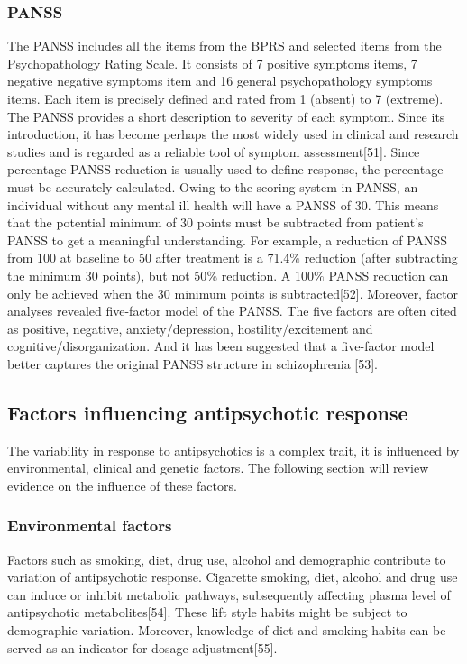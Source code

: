 \documentclass[12pt]{report}
\begin{document}
			\subsubsection{PANSS}
				The PANSS includes all the items from the BPRS and selected items from the Psychopathology Rating Scale. 
				It consists of 7 positive symptoms items, 7 negative negative symptoms item and 16 general psychopathology symptoms items. 
				Each item is precisely defined and rated from 1 (absent) to 7 (extreme). 
				The PANSS provides a short description to severity of each symptom. Since its introduction, it has become perhaps the most widely used in clinical and research studies and is regarded as a reliable tool of symptom assessment[51]. 
				Since percentage PANSS reduction is usually used to define response, the percentage must be accurately calculated. 
				Owing to the scoring system in PANSS, an individual without any mental ill health will have a PANSS of 30. 
				This means that the potential minimum of 30 points must be subtracted from patient’s PANSS to get a meaningful understanding. 
				For example, a reduction of PANSS from 100 at baseline to 50 after treatment is a 71.4$\%$ reduction (after subtracting the minimum 30 points), but not 50$\%$ reduction. A 100$\%$ PANSS reduction can only be achieved when the 30 minimum points is subtracted[52]. 
				Moreover, factor analyses revealed five-factor model of the PANSS. 
				The five factors are often cited as positive, negative, anxiety/depression, hostility/excitement and cognitive/disorganization. 
				And it has been suggested that a five-factor model better captures the original PANSS structure in schizophrenia [53]. 
			\subsection{Factors influencing antipsychotic response}
				The variability in response to antipsychotics is a complex trait, it is influenced by environmental, clinical and genetic factors. 
				The following section will review evidence on the influence of these factors. 
			\subsubsection{Environmental factors}
				Factors such as smoking, diet, drug use, alcohol and demographic contribute to variation of antipsychotic response. 
				Cigarette smoking, diet, alcohol and drug use can induce or inhibit metabolic pathways, subsequently affecting plasma level of antipsychotic metabolites[54]. 
				These lift style habits might be subject to demographic variation. 
				Moreover, knowledge of diet and smoking habits can be served as an indicator for dosage adjustment[55]. 
\end{document}
